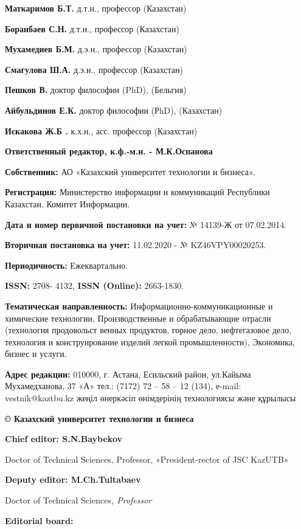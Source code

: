 \textbf{Маткаримов Б.Т.} д.т.н., профессор (Казахстан)

\textbf{Боранбаев С.Н.} д.т.н., профессор (Казахстан)

\textbf{Мухамедиев Б.М.} д.э.н., профессор (Казахстан)

\textbf{Смагулова Ш.А.} д.э.н., профессор (Казахстан)

\textbf{Пешков В.} доктор философии (PhD), (Бельгия)

\textbf{Айбульдинов Е.К.} доктор философии (РhD), (Казахстан)

\textbf{Искакова Ж.Б .} к.х.н., асс. профессор (Казахстан)

\begin{center}
\textbf{Ответственный редактор, к.ф.-м.н. - М.К.Оспанова}
\end{center}

\textbf{Собственник:} АО «Казахский университет технологии и бизнеса».

\textbf{Регистрация:} Министерство информации и коммуникаций Республики
Казахстан. Комитет Информации.

\textbf{Дата и номер первичной постановки на учет:} № 14139-Ж от
07.02.2014.

\textbf{Вторичная постановка на учет:} 11.02.2020 - № KZ46VPY00020253.

\textbf{Периодичность:} Ежеквартально.

\textbf{ISSN:} 2708- 4132, \textbf{ISSN (Online):} 2663-1830.

\textbf{Тематическая направленность:} Информационно-коммуникационные и
химические технологии, Производственные и обрабатывающие отрасли (технология
продовольст венных продуктов, горное дело, нефтегазовое дело, технология и
конструирование изделий легкой промышленности), Экономика, бизнес и
услуги.

\textbf{Адрес редакции:} 010000, г. Астана, Есильский район, ул.Кайыма
Мухамедханова, 37 «А» тел.: (7172) 72 -- 58 -- 12 (134), е-mail: vestnik@kaztbu.kz
жеңіл өнеркәсіп өнімдерінің технологиясы және құрылысы

\begin{center}
\textbf{\large © Казахский университет технологии и бизнеса}
\end{center}

\pagebreak

\begin{center}
\textbf{Chief editor: S.N.Baybekov}

Doctor of Technical Sciences, Professor, «President-rector of JSC
KazUTB»

\textbf{Deputy editor: M.Ch.Tultabaev}

Doctor of Technical Sciences\emph{, Professor}

\textbf{Editorial board:}
\end{center}

